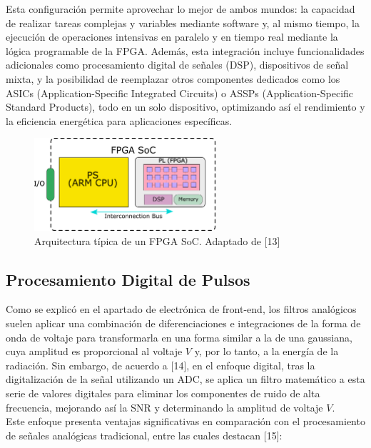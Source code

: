 \documentclass[]{book}
\begin{document}
\noindent Esta configuración permite aprovechar lo mejor de ambos mundos: la capacidad de realizar tareas complejas y variables mediante software y, al mismo tiempo, la ejecución de operaciones intensivas en paralelo y en tiempo real mediante la lógica programable de la FPGA. Además, esta integración incluye funcionalidades adicionales como procesamiento digital de señales (DSP), dispositivos de señal mixta, y la posibilidad de reemplazar otros componentes dedicados como los ASICs (Application-Specific Integrated Circuits) o ASSPs (Application-Specific Standard Products), todo en un solo dispositivo, optimizando así el rendimiento y la eficiencia energética para aplicaciones específicas.\\

\begin{figure}[h]
    \centering
    \includegraphics[width=0.6\textwidth]{FPGA_SoC.png}
    \caption{Arquitectura típica de un FPGA SoC. Adaptado de [13]}
    \label{fig:fpga_soc}

\end{figure}

\subsection{Procesamiento Digital de Pulsos}
 
\noindent Como se explicó en el apartado de electrónica de front-end, los filtros analógicos suelen aplicar una combinación de diferenciaciones e integraciones de la forma de onda de voltaje para transformarla en una forma similar a la de una gaussiana, cuya amplitud es proporcional al voltaje $V$ y, por lo tanto, a la energía de la radiación. Sin embargo, de acuerdo a [14], en el enfoque digital, tras la digitalización de la señal utilizando un ADC, se aplica un filtro matemático a esta serie de valores digitales para eliminar los componentes de ruido de alta frecuencia, mejorando así la SNR y determinando la amplitud de voltaje $V$.\\

\noindent Este enfoque presenta ventajas significativas en comparación con el procesamiento de señales analógicas tradicional, entre las cuales destacan [15]:
\end{document}
